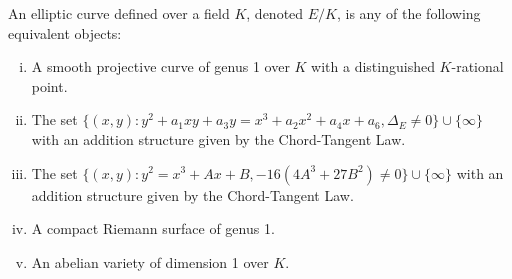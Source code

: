 \begin{dfn}
An elliptic curve defined over a field $K$, denoted $E/K$, is any of the following equivalent objects: \leavevmode\vspace{-1em}
	\begin{enumerate}[(i)] \itemsep-1em
	\item A smooth projective curve of genus 1 over $K$ with a distinguished $K$-rational point.
	\item The set $\{ (x,y) \colon y^2 + a_1xy + a_3y= x^3 + a_2x^2 + a_4x + a_6, \Delta_E \neq 0 \} \cup \{ \infty \}$ with an addition structure given by the Chord-Tangent Law. 
	\item The set $\{ (x,y) \colon y^2= x^3 + Ax + B, -16(4A^3 + 27B^2) \neq 0 \} \cup \{ \infty \}$ with an addition structure given by the Chord-Tangent Law. 
	\item A compact Riemann surface of genus 1. 
	\item An abelian variety of dimension 1 over $K$.
	\end{enumerate}
\end{dfn}


